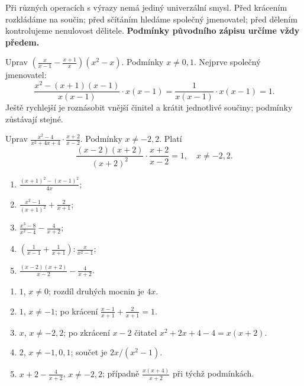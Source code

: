 \documentclass[11pt,a4paper]{article}
\begin{document}
Při různých operacích s výrazy nemá jediný univerzální  smysl. Před krácením rozkládáme na součin; před sčítáním hledáme společný jmenovatel; před dělením kontrolujeme nenulovost dělitele. \textbf{Podmínky původního zápisu určíme vždy předem.}
\begin{prikladReseniBox}[breakable=false,title={Příklad 1}]
Uprav $\displaystyle\left(\frac{x}{x-1}-\frac{x+1}{x}\right)(x^2-x)$.
\tcblower
Podmínky $x\ne0,1$. Nejprve společný jmenovatel:
\[\frac{x^2-(x+1)(x-1)}{x(x-1)}\cdot x(x-1)=\frac1{x(x-1)}\cdot x(x-1)=1.\]
Ještě rychlejší je roznásobit vnější činitel a krátit jednotlivé součiny; podmínky zůstávají stejné.
\end{prikladReseniBox}
\begin{prikladReseniBox}[breakable=false,title={Příklad 2}]
Uprav $\displaystyle\frac{x^2-4}{x^2+4x+4}\cdot\frac{x+2}{x-2}$.
\tcblower
Podmínky $x\ne-2,2$. Platí
\[\frac{(x-2)(x+2)}{(x+2)^2}\cdot\frac{x+2}{x-2}=1,\quad x\ne-2,2.\]
\end{prikladReseniBox}
\begin{zadaniReseniBox}[breakable=false,title={Samostatná práce 1}]
\begin{enumerate}[label=\alph*)]
\item $\frac{(x+1)^2-(x-1)^2}{4x}$;
\item $\frac{x^2-1}{(x+1)^2}+\frac2{x+1}$;
\item $\frac{x^3-8}{x^2-4}-\frac4{x+2}$;
\item $\left(\frac1{x-1}+\frac1{x+1}\right):\frac{x}{x^2-1}$;
\item $\frac{(x-2)(x+2)}{x-2}-\frac{4}{x+2}$.
\end{enumerate}
\tcblower
\begin{enumerate}[label=\alph*)]
\item $1$, $x\ne0$; rozdíl druhých mocnin je $4x$.
\item $1$, $x\ne-1$; po krácení $\frac{x-1}{x+1}+\frac2{x+1}=1$.
\item $x$, $x\ne-2,2$; po zkrácení $x-2$ čitatel $x^2+2x+4-4=x(x+2)$.
\item $2$, $x\ne-1,0,1$; součet je $2x/(x^2-1)$.
\item $x+2-\frac4{x+2}$, $x\ne-2,2$; případně $\frac{x(x+4)}{x+2}$ při týchž podmínkách.
\end{enumerate}
\end{zadaniReseniBox}
\end{document}
